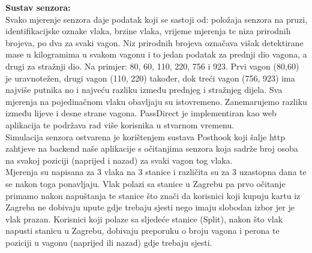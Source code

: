 \textbf{Sustav senzora:}\\
Svako mjerenje senzora daje podatak koji se sastoji od: položaja senzora na pruzi, identifikacijske oznake vlaka, brzine vlaka, vrijeme mjerenja te niza prirodnih brojeva, po dva za svaki vagon. Niz prirodnih brojeva označava višak detektirane mase u kilogramima u svakom vagonu i to jedan podatak za prednji dio vagona, a drugi za stražnji dio. Na primjer:  80, 60, 110, 220, 756 i 923. Prvi vagon (80,60) je uravnotežen, drugi vagon (110, 220) također, dok treći vagon (756, 923) ima najviše putnika no i najveću razliku između prednjeg i stražnjeg dijela. Sva mjerenja na pojedinačnom vlaku obavljaju su istovremeno. Zanemarujemo razliku između lijeve i desne strane vagona. PassDirect je implementiran kao web aplikacija te podržava rad više korisnika u stvarnom vremenu.\\

Simulacija senzora ostvarena je korištenjem sustava Posthook koji šalje http zahtjeve na backend naše aplikacije s očitanjima senzora koja sadrže broj osoba na svakoj poziciji (naprijed i nazad) za svaki vagon tog vlaka.\\
Mjerenja su napisana za 3 vlaka na 3 stanice i različita su za 3 uzastopna dana te se nakon toga ponavljaju.
Vlak polazi sa stanice u Zagrebu pa prvo očitanje primamo nakon napuštanja te stanice što znači da korisnici koji kupuju kartu iz Zagreba ne dobivaju upute gdje trebaju sjesti nego imaju slobodan izbor jer je vlak prazan. Korisnici koji polaze sa sljedeće stanice (Split), nakon što vlak napusti stanicu u Zagrebu, dobivaju preporuku o broju vagona i perona te poziciji u vagonu (naprijed ili nazad) gdje trebaju sjesti. \\

